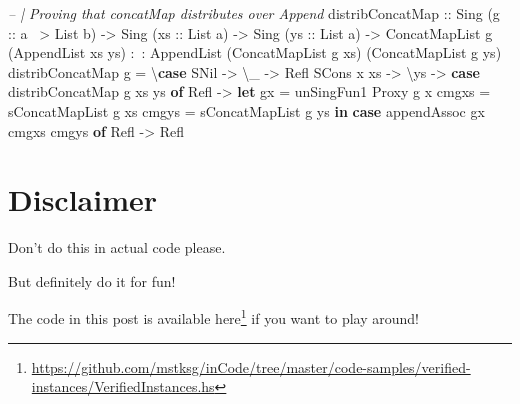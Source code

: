 \documentclass[]{article}
\newenvironment{Shaded}{}{}
\newcommand{\KeywordTok}[1]{\textcolor[rgb]{0.00,0.44,0.13}{\textbf{{#1}}}}
\newcommand{\DataTypeTok}[1]{\textcolor[rgb]{0.56,0.13,0.00}{{#1}}}
\newcommand{\CommentTok}[1]{\textcolor[rgb]{0.38,0.63,0.69}{\textit{{#1}}}}
\newcommand{\OtherTok}[1]{\textcolor[rgb]{0.00,0.44,0.13}{{#1}}}
\newcommand{\FunctionTok}[1]{\textcolor[rgb]{0.02,0.16,0.49}{{#1}}}
\newcommand{\NormalTok}[1]{{#1}}
\renewcommand{\href}[2]{#2\footnote{\url{#1}}}
\begin{document}
\begin{Shaded}
\begin{Highlighting}[]
\CommentTok{-- | Proving that concatMap distributes over Append}
\NormalTok{distribConcatMap}
\OtherTok{    ::} \DataTypeTok{Sing} \NormalTok{(}\OtherTok{g ::} \NormalTok{a }\FunctionTok{~>} \DataTypeTok{List} \NormalTok{b)}
    \OtherTok{->} \DataTypeTok{Sing} \NormalTok{(}\OtherTok{xs ::} \DataTypeTok{List} \NormalTok{a)}
    \OtherTok{->} \DataTypeTok{Sing} \NormalTok{(}\OtherTok{ys ::} \DataTypeTok{List} \NormalTok{a)}
    \OtherTok{->} \DataTypeTok{ConcatMapList} \NormalTok{g (}\DataTypeTok{AppendList} \NormalTok{xs ys) }\FunctionTok{:~:} \DataTypeTok{AppendList} \NormalTok{(}\DataTypeTok{ConcatMapList} \NormalTok{g xs) (}\DataTypeTok{ConcatMapList} \NormalTok{g ys)}
\NormalTok{distribConcatMap g }\FunctionTok{=} \NormalTok{\textbackslash{}}\KeywordTok{case}
    \DataTypeTok{SNil} \OtherTok{->} \NormalTok{\textbackslash{}_ }\OtherTok{->} \DataTypeTok{Refl}
    \DataTypeTok{SCons} \NormalTok{x xs }\OtherTok{->} \NormalTok{\textbackslash{}ys }\OtherTok{->}
      \KeywordTok{case} \NormalTok{distribConcatMap g xs ys }\KeywordTok{of}
        \DataTypeTok{Refl} \OtherTok{->}
          \KeywordTok{let} \NormalTok{gx    }\FunctionTok{=} \NormalTok{unSingFun1 }\DataTypeTok{Proxy} \NormalTok{g x}
              \NormalTok{cmgxs }\FunctionTok{=} \NormalTok{sConcatMapList g xs}
              \NormalTok{cmgys }\FunctionTok{=} \NormalTok{sConcatMapList g ys}
          \KeywordTok{in}  \KeywordTok{case} \NormalTok{appendAssoc gx cmgxs cmgys }\KeywordTok{of}
                \DataTypeTok{Refl} \OtherTok{->} \DataTypeTok{Refl}
\end{Highlighting}
\end{Shaded}

\section{Disclaimer}\label{disclaimer}

Don't do this in actual code please.

But definitely do it for fun!

The code in this post is available
\href{https://github.com/mstksg/inCode/tree/master/code-samples/verified-instances/VerifiedInstances.hs}{here}
if you want to play around!
\end{document}
